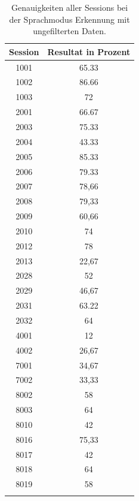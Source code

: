 \begin{table}[H]
 \centering
 \caption{Genauigkeiten aller Sessions bei der Sprachmodus Erkennung mit ungefilterten Daten. }
\begin{tabular}{|c|c|}
\hline 
Session & Resultat in Prozent \\ 
\hline 
1001 & 65.33 \\ 
\hline 
1002 & 86.66\\ 
\hline 
1003 & 72 \\ 
\hline 
2001 & 66.67 \\ 
\hline 
2003 & 75.33 \\ 
\hline 
2004 & 43.33 \\  
\hline 
2005 & 85.33 \\ 
\hline 
2006 & 79.33 \\
\hline 
2007 & 78,66 \\
\hline 
2008 & 79,33 \\
\hline 
2009 & 60,66 \\
\hline 
2010 & 74 \\
\hline 
2012 & 78 \\
\hline 
2013 & 22,67 \\
\hline 
2028 & 52 \\
\hline 
2029 & 46,67 \\
\hline 
2031 & 63.22 \\
\hline 
2032 & 64 \\
\hline 
4001 & 12 \\ 
\hline 
4002 & 26,67 \\ 
\hline 
7001 & 34,67 \\ 
\hline 
7002 & 33,33 \\ 
\hline 
8002 & 58 \\ 
\hline 
8003 & 64 \\
\hline 
8010 & 42 \\
\hline 
8016 & 75,33 \\
\hline 
8017 & 42 \\
\hline 
8018 & 64 \\
\hline 
8019 & 58  \\ 
\hline 
\label{tab:UnfModeSessions} 
\end{tabular}
\end{table}



